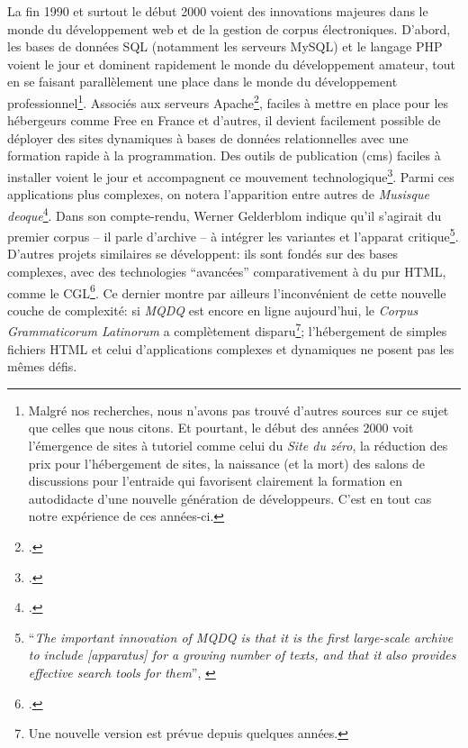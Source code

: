 La fin 1990 et surtout le début 2000 voient des innovations majeures dans le monde du développement web et de la gestion de corpus électroniques. D'abord, les bases de données SQL (notamment les serveurs MySQL) et le langage PHP voient le jour et dominent rapidement le monde du développement amateur, tout en se faisant parallèlement une place dans le monde du développement professionnel\footnote{Malgré nos recherches, nous n'avons pas trouvé d'autres sources sur ce sujet que celles que nous citons. Et pourtant, le début des années 2000 voit l'émergence de sites à tutoriel comme celui du \textit{Site du zéro}, la réduction des prix pour l'hébergement de sites, la naissance (et la mort) des salons de discussions pour l'entraide qui favorisent clairement la formation en autodidacte d'une nouvelle génération de développeurs. C'est en tout cas notre expérience de ces années-ci.}. Associés aux serveurs Apache\footcite{smith_lamp_nodate}, faciles à mettre en place pour les hébergeurs comme Free en France et d'autres, il devient facilement possible de déployer des sites dynamiques à bases de données relationnelles avec une formation rapide à la programmation. Des outils de publication (\acrlong{cms}) faciles à installer voient le jour et accompagnent ce mouvement technologique\footcite{purer_php_nodate}. Parmi ces applications plus complexes, on notera l'apparition entre autres de \textit{Musisque deoque}\footcite{gelderblom_musisque_2008}. Dans son compte-rendu, Werner Gelderblom indique qu'il s'agirait du premier corpus -- il parle d'archive -- à intégrer les variantes et l'apparat critique\footnote{``\textit{The important innovation of MQDQ is that it is the first large-scale archive to include [apparatus] for a growing number of texts, and that it also provides effective search tools for them}'', \cite[p.233]{gelderblom_musisque_2008}}. D'autres projets similaires se développent: ils sont fondés sur des bases complexes, avec des technologies \enquote{avancées} comparativement à du pur HTML, comme le CGL\footcite{garcea_corpus_2010}. Ce dernier montre par ailleurs l'inconvénient de cette nouvelle couche de complexité: si \textit{MQDQ} est encore en ligne aujourd'hui, le \textit{Corpus Grammaticorum Latinorum} a complètement disparu\footnote{Une nouvelle version est prévue depuis quelques années.}; l'hébergement de simples fichiers HTML et celui d'applications complexes et dynamiques ne posent pas les mêmes défis.

